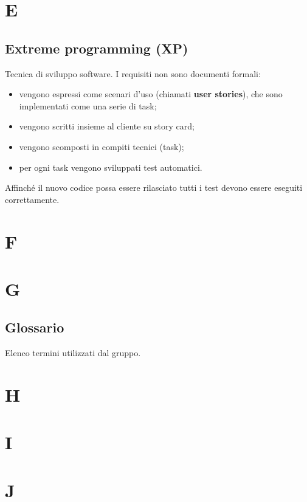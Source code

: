 \documentclass[a4paper,12pt]{article}
\begin{document}
\section{E}

\subsection{Extreme programming (XP)}
Tecnica di sviluppo software.  
I requisiti non sono documenti formali:
\begin{itemize}
\item vengono espressi come scenari d’uso (chiamati \textbf{user stories}), che sono implementati come una serie di task;
\item vengono scritti insieme al cliente su story card;
\item vengono scomposti in compiti tecnici (task);
\item per ogni task vengono sviluppati test automatici.
\end{itemize}
Affinché il nuovo codice possa essere rilasciato tutti i test devono essere eseguiti correttamente.

\section{F}

\section{G}

\subsection{Glossario}
Elenco termini utilizzati dal gruppo.

\section{H}

\section{I}

\section{J}
\end{document}

